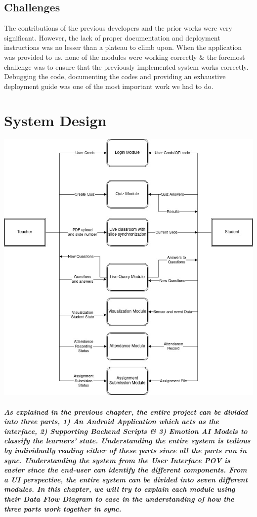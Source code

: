 \documentclass[10pt]{report}
\begin{document}
\section{Challenges}
The contributions of the previous developers and the prior works were very significant. However, the lack of proper documentation and deployment instructions was no lesser than a plateau to climb upon. When the application was provided to us, none of the modules were working correctly \& the foremost challenge was to ensure that the previously implemented system works correctly. Debugging the code, documenting the codes and providing an exhaustive deployment guide was one of the most important work we had to do.  
\chapter{System Design} \vspace{-10mm}
\includegraphics[width=\textwidth]{toplevel.jpeg} \newpage 
\paragraph{As explained in the previous chapter, the entire project can be divided into three parts, 1) An Android Application which acts as the interface, 2) Supporting Backend Scripts \& 3) Emotion AI Models to classify the learners' state. Understanding the entire system is tedious by individually reading either of these parts since all the parts run in sync. Understanding the system from the User Interface POV is easier since the end-user can identify the different components. From a UI perspective, the entire system can be divided into seven different modules. In this chapter, we will try to explain each module using their Data Flow Diagram to ease in the understanding of how the three parts work together in sync.}  
\end{document}
